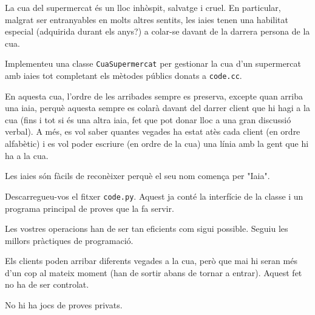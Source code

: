 

\Statement


La cua del supermercat és un lloc inhòspit, salvatge i cruel. En particular, malgrat ser entranyables en molts altres sentits, les iaies tenen una habilitat especial (adquirida durant els anys?) a colar-se davant de la darrera persona de la cua.

\medskip

Implementeu una classe \lstinline|CuaSupermercat| per gestionar la cua d'un supermercat amb iaies tot completant els mètodes públics donats a \texttt{code.cc}.

\medskip

En aquesta cua, l'ordre de les arribades sempre es preserva, excepte quan arriba una iaia, perquè aquesta sempre es colarà davant del darrer client que hi hagi a la cua (fins i tot si és una altra iaia, fet que pot donar lloc a una gran discussió verbal). A més, es vol saber quantes vegades ha estat atès cada client (en ordre alfabètic) i es vol poder escriure (en ordre de la cua) una línia amb la gent que hi ha a la cua.

\medskip

Les iaies són fàcils de reconèixer perquè el seu nom comença per "Iaia".

\medskip

Descarregueu-vos el fitxer \texttt{code.py}. Aquest ja conté la interfície de la classe i un programa principal de proves que la fa servir.

\medskip

Les vostres operacions han de ser tan eficients com sigui possible. Seguiu les millors pràc\-tiques de programació.

\medskip

Els clients poden arribar diferents vegades a la cua, però que mai hi seran més d'un cop al mateix moment (han de sortir abans de tornar a entrar). Aquest fet no ha de ser controlat.

\medskip

No hi ha jocs de proves privats.


\SampleOneCol
